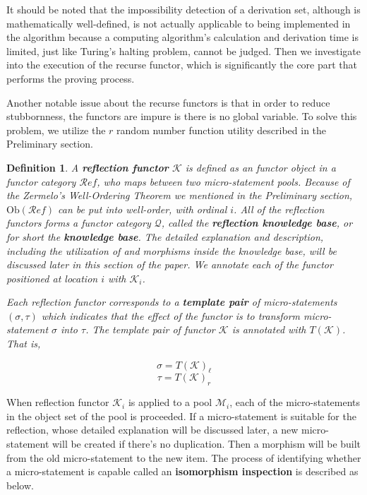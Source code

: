\documentclass{article}
\newtheorem{definition}{Definition}	%
\numberwithin{theorem}{section}	%
\numberwithin{axiom}{section}	%
\numberwithin{definition}{section}	%
\begin{document}
It should be noted that the impossibility detection of a derivation set, although is mathematically well-defined, is not actually applicable to being implemented in the algorithm because a computing algorithm{'}s calculation and derivation time is limited, just like Turing{'}s halting problem, cannot be judged. Then we investigate into the execution of the recurse functor, which is significantly the core part that performs the proving process.

Another notable issue about the recurse functors is that in order to reduce stubbornness, the functors are impure is there is no global variable. To solve this problem, we utilize the \(\mathit{r}\) random number function utility described in the Preliminary section.

\begin{definition}
	A \textbf{ reflection functor} \(\mathcal{K}\) is defined as an functor object in a functor category \(\mathcal{R}\mathit{e}\mathit{f}\), who maps between two micro-statement pools. Because of the Zermelo{'}s Well-Ordering Theorem we mentioned in the Preliminary section, \(\text{Ob}(\mathcal{R}\mathit{e}\mathit{f})\) can be put into well-order, with ordinal \(i\). All of the reflection functors forms a functor category \(\mathcal{Q}\), called the \textbf{ reflection knowledge base}, or for short the \textbf{ knowledge base}. The detailed explanation and description, including the utilization of and morphisms inside the knowledge base, will be discussed later in this section of the paper. We annotate each of the functor positioned at location \(i\) with \(\mathcal{K}_i\).
	
	Each reflection functor corresponds to a \textbf{ template pair} of micro-statements \((\sigma ,\tau )\) which indicates that the effect of the functor is to transform micro-statement \(\sigma\) into $\tau $. The template pair of functor \(\mathcal{K}\) is annotated with \(T(\mathcal{K})\). That
	is,
	
	\[\sigma =T(\mathcal{K})_{\ell }\]
	\[\tau =T(\mathcal{K})_{\mathit{r}}\]
\end{definition}

When reflection functor \(\mathcal{K}_i\) is applied to a pool \(\mathcal{M}_i\), each of the micro-statements in the object set of the pool is proceeded. If a micro-statement is suitable for the reflection, whose detailed explanation will be discussed later, a new micro-statement will be created if there{'}s no duplication. Then a morphism will be built from the old micro-statement to the new item. The process of identifying whether a micro-statement is capable called an \textbf{ isomorphism inspection} is described as below.
\end{document}
